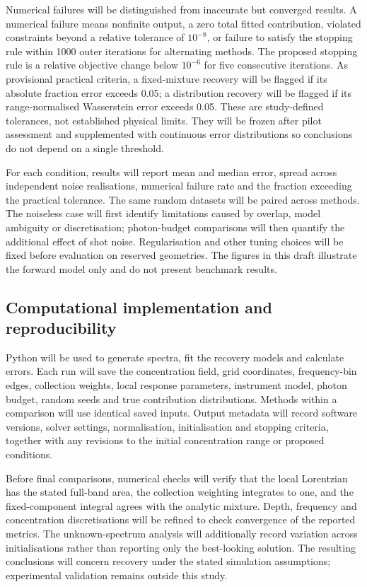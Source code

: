 \documentclass[11pt]{article}
\begin{document}
Numerical failures will be distinguished from inaccurate but converged results. A numerical failure means nonfinite output, a zero total fitted contribution, violated constraints beyond a relative tolerance of $10^{-8}$, or failure to satisfy the stopping rule within 1000 outer iterations for alternating methods. The proposed stopping rule is a relative objective change below $10^{-6}$ for five consecutive iterations. As provisional practical criteria, a fixed-mixture recovery will be flagged if its absolute fraction error exceeds 0.05; a distribution recovery will be flagged if its range-normalised Wasserstein error exceeds 0.05. These are study-defined tolerances, not established physical limits. They will be frozen after pilot assessment and supplemented with continuous error distributions so conclusions do not depend on a single threshold.

For each condition, results will report mean and median error, spread across independent noise realisations, numerical failure rate and the fraction exceeding the practical tolerance. The same random datasets will be paired across methods. The noiseless case will first identify limitations caused by overlap, model ambiguity or discretisation; photon-budget comparisons will then quantify the additional effect of shot noise. Regularisation and other tuning choices will be fixed before evaluation on reserved geometries. The figures in this draft illustrate the forward model only and do not present benchmark results.


\subsection{Computational implementation and reproducibility}

Python will be used to generate spectra, fit the recovery models and calculate errors. Each run will save the concentration field, grid coordinates, frequency-bin edges, collection weights, local response parameters, instrument model, photon budget, random seeds and true contribution distributions. Methods within a comparison will use identical saved inputs. Output metadata will record software versions, solver settings, normalisation, initialisation and stopping criteria, together with any revisions to the initial concentration range or proposed conditions.

Before final comparisons, numerical checks will verify that the local Lorentzian has the stated full-band area, the collection weighting integrates to one, and the fixed-component integral agrees with the analytic mixture. Depth, frequency and concentration discretisations will be refined to check convergence of the reported metrics. The unknown-spectrum analysis will additionally record variation across initialisations rather than reporting only the best-looking solution. The resulting conclusions will concern recovery under the stated simulation assumptions; experimental validation remains outside this study.
\end{document}
